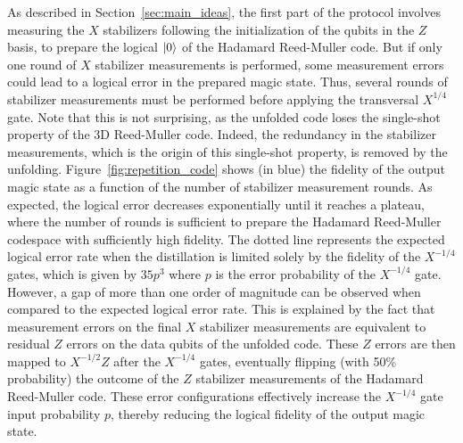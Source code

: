 \documentclass[%
 reprint,
superscriptaddress,
 amsmath,amssymb,
 aps,
]{revtex4-2}
\begin{document}
As described in Section~\ref{sec:main_ideas}, the first part of the protocol involves measuring the $X$ stabilizers following the initialization of the qubits in the $Z$ basis, to prepare the logical $\ket{0}$ of the Hadamard Reed-Muller code. But if only one round of $X$ stabilizer measurements is performed, some measurement errors could lead to a logical error in the prepared magic state. Thus, several rounds of stabilizer measurements must be performed before applying the transversal $X^{1/4}$ gate. Note that this is not surprising, as the unfolded code loses the single-shot property of the 3D Reed-Muller code. Indeed, the redundancy in the stabilizer measurements, which is the origin of this single-shot property, is removed by the unfolding. Figure~\ref{fig:repetition_code} shows (in blue) the fidelity of the output magic state as a function of the number of stabilizer measurement rounds. As expected, the logical error decreases exponentially until it reaches a plateau, where the number of rounds is sufficient to prepare the Hadamard Reed-Muller codespace with sufficiently high fidelity. The dotted line represents the expected logical error rate when the distillation is limited solely by the fidelity of the $X^{-1/4}$ gates, which is given by $35p^3$ where $p$ is the error probability of the $X^{-1/4}$ gate. However, a gap of more than one order of magnitude can be observed when compared to the expected logical error rate. This is explained by the fact that measurement errors on the final $X$ stabilizer measurements are equivalent to residual $Z$ errors on the data qubits of the unfolded code. These $Z$ errors are then mapped to $X^{-1/2} Z$ after the $X^{-1/4}$ gates, eventually flipping (with 50\% probability) the outcome of the $Z$ stabilizer measurements of the Hadamard Reed-Muller code. These error configurations effectively increase the $X^{-1/4}$ gate input probability $p$, thereby reducing the logical fidelity of the output magic state.
\end{document}
